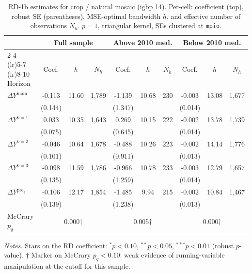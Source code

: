 \documentclass[11pt]{article}
\begin{document}
\begin{table}[H]
\centering
\scriptsize
\caption{RD-1b estimates for crop / natural mosaic (igbp 14). Per-cell: coefficient
(top), robust SE (parentheses), MSE-optimal bandwidth $h$, and
effective number of observations $N_h$. $p=1$, triangular kernel,
SEs clustered at \texttt{mpio}.}
\label{tab:rdplot_rd1b_crop_nature}
\begin{tabular}{l ccc ccc ccc}
\toprule
 & \multicolumn{3}{c}{Full sample} & \multicolumn{3}{c}{Above 2010 med.} & \multicolumn{3}{c}{Below 2010 med.} \\
\cmidrule(lr){2-4} \cmidrule(lr){5-7} \cmidrule(lr){8-10}
Horizon & Coef. & $h$ & $N_h$ & Coef. & $h$ & $N_h$ & Coef. & $h$ & $N_h$ \\
\midrule
$\Delta Y^{\text{main}}$ & -0.113 & 11.60 & 1,789 & -1.139 & 10.68 & 230 & -0.003 & 13.08 & 1,677 \\
 & (0.144) &  &  & (1.347) &  &  & (0.014) &  &  \\
\addlinespace[1pt]
$\Delta Y^{k=1}$ & 0.033 & 10.35 & 1,643 & 0.269 & 10.15 & 222 & -0.002 & 13.78 & 1,739 \\
 & (0.075) &  &  & (0.645) &  &  & (0.014) &  &  \\
\addlinespace[1pt]
$\Delta Y^{k=2}$ & -0.046 & 10.64 & 1,678 & -0.488 & 10.26 & 223 & -0.002 & 14.14 & 1,776 \\
 & (0.101) &  &  & (0.911) &  &  & (0.013) &  &  \\
\addlinespace[1pt]
$\Delta Y^{k=3}$ & -0.098 & 11.59 & 1,786 & -0.966 & 10.78 & 233 & -0.003 & 12.79 & 1,657 \\
 & (0.135) &  &  & (1.259) &  &  & (0.014) &  &  \\
\addlinespace[1pt]
$\Delta Y^{\text{pre}_3}$ & -0.106 & 12.17 & 1,854 & -1.485 & 9.94 & 215 & -0.002 & 10.84 & 1,467 \\
 & (0.139) &  &  & (1.238) &  &  & (0.013) &  &  \\
\addlinespace[1pt]
\midrule
McCrary $p_q$ & \multicolumn{3}{c}{0.000$\dagger$} & \multicolumn{3}{c}{0.005$\dagger$} & \multicolumn{3}{c}{0.000$\dagger$} \\
\bottomrule
\end{tabular}
\begin{flushleft}\footnotesize
\textit{Notes.} Stars on the RD coefficient: $^{*}p<0.10$,
$^{**}p<0.05$, $^{***}p<0.01$ (robust $p$-value).
$\dagger$ Marker on McCrary $p_q<0.10$: weak evidence of running-variable manipulation at the cutoff for this sample.\\
\end{flushleft}
\end{table}
\end{document}
